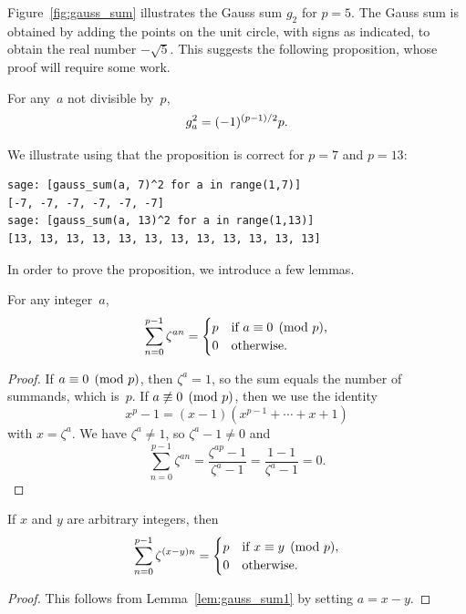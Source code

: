 Figure~\ref{fig:gauss_sum} illustrates the Gauss sum $g_2$ for $p=5$.
The Gauss sum is obtained by adding the points on the unit circle,
with signs as indicated, to obtain the real number $-\sqrt{5}$.  This
suggests the following proposition, whose proof will require some
work.

\begin{proposition}\label{prop:gauss_sum1}
For any~$a$ not divisible by~$p$,
$$
\displaystyle g_a^2 = (-1)^{(p-1)/2}p.
$$
\end{proposition}

\begin{sg}
We illustrate using \sage that the proposition is
correct for $p=7$ and $p=13$:
\begin{verbatim}
sage: [gauss_sum(a, 7)^2 for a in range(1,7)]
[-7, -7, -7, -7, -7, -7]
sage: [gauss_sum(a, 13)^2 for a in range(1,13)]
[13, 13, 13, 13, 13, 13, 13, 13, 13, 13, 13, 13]
\end{verbatim}
\end{sg}

In order to prove the proposition, we introduce a few lemmas.

\begin{lemma}\label{lem:gauss_sum1}
For any integer~$a$,
$$
\sum_{n=0}^{p-1} \zeta^{an} = \begin{cases}
        p & \text{\rm if $a \equiv 0\pmod{p}$,}\\
        0 & \text{\rm otherwise.}  \end{cases}
$$
\end{lemma}
\begin{proof}
If $a\equiv 0\pmod{p}$, then $\zeta^a=1$, so the sum equals the number of summands,
which is~$p$.  If $a\not\equiv 0\pmod{p}$, then we use the
identity $$x^p - 1 = (x-1)(x^{p-1} + \cdots + x + 1)$$ with $x = \zeta^a$. We have
 $\zeta^a\neq 1$, so $\zeta^a - 1 \neq 0$ and
$$
\sum_{n=0}^{p-1} \zeta^{an} = \frac{\zeta^{ap}-1}{\zeta^a-1} =
\frac{1-1}{\zeta^a-1} = 0.
$$
\end{proof}

\begin{lemma}\label{lem:gauss_sum2}
If $x$ and $y$ are arbitrary integers, then
$$
\sum_{n=0}^{p-1} \zeta^{(x-y)n} =
\begin{cases}
p & \text{\rm if $x\equiv y\pmod{p}$},\\
0 & \text{\rm otherwise}.
\end{cases}
$$
\end{lemma}
\begin{proof}
This follows from Lemma~\ref{lem:gauss_sum1} by
setting $a=x-y$.
\end{proof}


